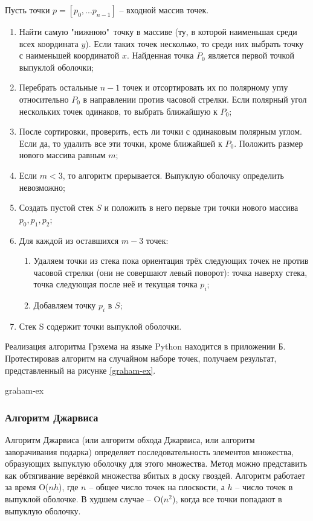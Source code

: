 Пусть точки $p=[p_0,...p_{n-1}]$ -- входной массив точек.
\begin{enumerate}
	\item Найти самую "нижнюю"\ точку в массиве (ту, в которой
наименьшая среди всех координата $y$). Если таких точек несколько, то
среди них выбрать точку с наименьшей координатой $x$. Найденная точка
$P_0$ является первой точкой выпуклой оболочки;
	\item Перебрать остальные $n-1$ точек и отсортировать их по 
полярному углу относительно $P_0$ в направлении против часовой стрелки.
Если полярный угол нескольких точек одинаков, то выбрать ближайшую к 
$P_0$;
	\item После сортировки, проверить, есть ли точки с одинаковым 
полярным углом. Если да, то удалить все эти точки, кроме ближайшей к
$P_0$. Положить размер нового массива равным $m$;
	\item Если $m < 3$, то алгоритм прерывается. Выпуклую оболочку 
определить невозможно;
	\item Создать пустой стек $S$ и положить в него первые три точки 
нового массива $p_0, p_1, p_2$;
	\item Для каждой из оставшихся $m-3$ точек:
	\begin{enumerate}
		\item Удаляем точки из стека пока ориентация трёх следующих
точек не против часовой стрелки (они не совершают левый поворот):
точка наверху стека, точка следующая после неё и текущая точка $p_i$;
		\item Добавляем точку $p_i$ в $S$;
	\end{enumerate}
	\item Стек S содержит точки выпуклой оболочки.
\end{enumerate}

Реализация алгоритма Грэхема на языке Python находится в приложении Б.
Протестировав алгоритм на случайном наборе
точек, получаем результат, представленный на рисунке \ref{graham-ex}.

{graham-ex}

\subsubsection{Алгоритм Джарвиса}

Алгоритм Джарвиса \cite{jarvis} (или алгоритм обхода Джарвиса, или алгоритм
заворачивания подарка) определяет последовательность элементов
множества, образующих выпуклую оболочку для этого множества. Метод
можно представить как обтягивание верёвкой множества вбитых в доску
гвоздей. Алгоритм работает за время  O($nh$), где $n$ -- общее число 
точек на плоскости, а $h$ -- число точек в выпуклой оболочке. В 
худшем случае -- O($n^2$), когда все точки попадают в выпуклую
оболочку.

